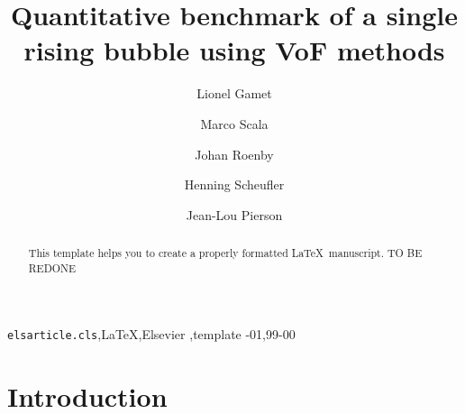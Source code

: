 \documentclass[review]{elsarticle}
\begin{document}
\begin{frontmatter}

\title{Quantitative benchmark of a single rising bubble using VoF methods}

\author[ifpenaddress]{Lionel Gamet}

\author[ifpenaddress]{Marco Scala}

\author[stromningaddress]{Johan Roenby}

\author[dlraddress]{Henning Scheufler}

\author[ifpenaddress]{Jean-Lou Pierson}

\address[ifpenaddress]{IFPEN Lyon, Process Experimentation Division, 69360 Solaize, France}
\address[stromningaddress]{STROMNING, Luftmarinegade 62, 1432 K{\o}benhavn K, Denmark}
\address[dlraddress]{DLR German Aerospace Center, Institute of Space Systems, 28359 Bremen, Germany}

\begin{abstract}
This template helps you to create a properly formatted \LaTeX\ manuscript.
TO BE REDONE
\end{abstract}

\begin{keyword}
\texttt{elsarticle.cls}\sep \LaTeX\sep Elsevier \sep template
-01\sep  99-00
\end{keyword}

\end{frontmatter}

\linenumbers

\section{Introduction}
\end{document}
